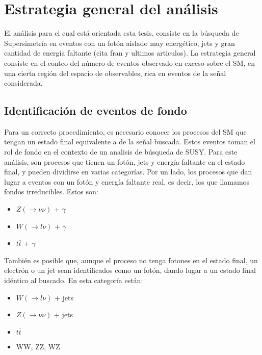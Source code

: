 \chapter{Estrategia general del análisis}



El análisis para el cual está orientada esta tesis, consiste en la búsqueda de Supersimetría en eventos con un fotón aislado muy energético, jets y gran cantidad de energía faltante (cita fran y ultimos articulos). La estrategia general consiste en el conteo del número de eventos observado en exceso sobre el SM, en una cierta región del espacio de observables, rica en eventos de la señal considerada.


\section{Identificación de eventos de fondo}

Para un correcto procedimiento, es necesario conocer los procesos del SM que tengan un estado final equivalente a de la señal buscada. Estos eventos toman el rol de fondo en el contexto de un analisis de búsqueda de SUSY. Para este análisis, son procesos que tienen un fotón, jets y energía faltante en el estado final, y pueden dividirse en varias categorías. Por un lado, los procesos que dan lugar a eventos con un fotón y energía faltante
real, es decir, los que llamamos fondos irreducibles. Estos son:

\begin{itemize}

	\item $Z(\rightarrow \nu\nu)$ + $\gamma$

	\item $W (\rightarrow l\nu)$ + $\gamma$

	\item $t \overline{t}$ + $\gamma$

\end{itemize}

También es posible que, aunque el proceso no tenga fotones en el estado final, un electrón o un jet sean identificados como un fotón, dando lugar a un estado final idéntico al buscado. En esta categoría están:

\begin{itemize}

	\item $W (\rightarrow l\nu)$ + jets

	\item $Z (\rightarrow \nu\nu)$ + jets

	\item $t \overline{t}$

	\item WW, ZZ, WZ

\end{itemize}

